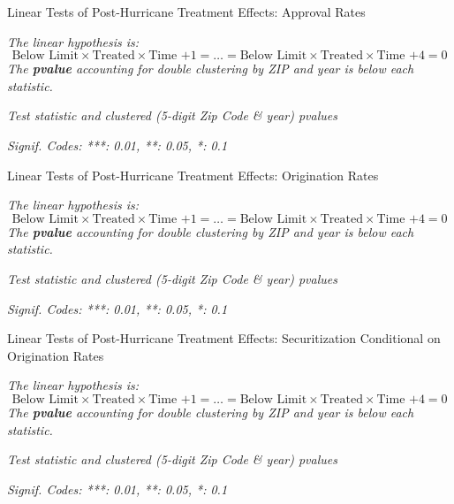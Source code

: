 \documentclass{article}
\begin{document}
\begin{table}

\caption{Linear Tests of Post-Hurricane Treatment Effects: Approval Rates}

\emph{The linear hypothesis is:}
$$ \textrm{Below Limit} \times \textrm{Treated} \times \textrm{Time +1} = \dots = \textrm{Below Limit} \times \textrm{Treated} \times \textrm{Time +4} = 0$$
\emph{The \textbf{pvalue} accounting for double clustering by ZIP and year is below each statistic.}

\begin{center}

\end{center}

\emph{Test statistic and clustered (5-digit Zip Code \& year) pvalues}
         
\emph{Signif. Codes: ***: 0.01, **: 0.05, *: 0.1}

\end{table}

\begin{table}

    \caption{Linear Tests of Post-Hurricane Treatment Effects: Origination Rates}
    
    \emph{The linear hypothesis is:}
    $$ \textrm{Below Limit} \times \textrm{Treated} \times \textrm{Time +1} = \dots = \textrm{Below Limit} \times \textrm{Treated} \times \textrm{Time +4} = 0$$
    \emph{The \textbf{pvalue} accounting for double clustering by ZIP and year is below each statistic.}
    
    \begin{center}
    
    \end{center}
    
    \emph{Test statistic and clustered (5-digit Zip Code \& year) pvalues}
     
    \emph{Signif. Codes: ***: 0.01, **: 0.05, *: 0.1}

    \end{table}

\begin{table}

        \caption{Linear Tests of Post-Hurricane Treatment Effects: Securitization Conditional on Origination Rates}
        
        \emph{The linear hypothesis is:}
        $$ \textrm{Below Limit} \times \textrm{Treated} \times \textrm{Time +1} = \dots = \textrm{Below Limit} \times \textrm{Treated} \times \textrm{Time +4} = 0$$
        \emph{The \textbf{pvalue} accounting for double clustering by ZIP and year is below each statistic.}
        
        \begin{center}
        
        \end{center}
        
        \emph{Test statistic and clustered (5-digit Zip Code \& year) pvalues}
         
        \emph{Signif. Codes: ***: 0.01, **: 0.05, *: 0.1}

\end{table}
        
\end{document}
